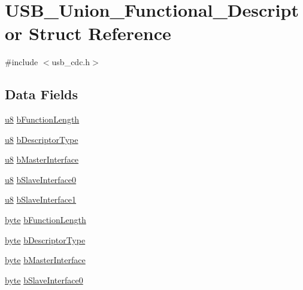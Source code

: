 \hypertarget{struct_u_s_b___union___functional___descriptor}{\section{U\-S\-B\-\_\-\-Union\-\_\-\-Functional\-\_\-\-Descriptor Struct Reference}
\label{struct_u_s_b___union___functional___descriptor}
}


{\ttfamily \#include $<$usb\-\_\-cdc.\-h$>$}

\subsection*{Data Fields}
\begin{DoxyCompactItemize}
\item 
\hyperlink{p8_2pinguino_2core_2typedef_8h_aed742c436da53c1080638ce6ef7d13de}{u8} \hyperlink{struct_u_s_b___union___functional___descriptor_a26c0bc44674a4154a958ce07a0d5b0fd}{b\-Function\-Length}
\item 
\hyperlink{p8_2pinguino_2core_2typedef_8h_aed742c436da53c1080638ce6ef7d13de}{u8} \hyperlink{struct_u_s_b___union___functional___descriptor_af6d6c7e334878414c973fc10e54cfb4e}{b\-Descriptor\-Type}
\item 
\hyperlink{p8_2pinguino_2core_2typedef_8h_aed742c436da53c1080638ce6ef7d13de}{u8} \hyperlink{struct_u_s_b___union___functional___descriptor_aa6c02ce2914ff851df5c3ac40bc4bba7}{b\-Master\-Interface}
\item 
\hyperlink{p8_2pinguino_2core_2typedef_8h_aed742c436da53c1080638ce6ef7d13de}{u8} \hyperlink{struct_u_s_b___union___functional___descriptor_a0329be90e8ea172f2fa8c0e14ff4e95f}{b\-Slave\-Interface0}
\item 
\hyperlink{p8_2pinguino_2core_2typedef_8h_aed742c436da53c1080638ce6ef7d13de}{u8} \hyperlink{struct_u_s_b___union___functional___descriptor_a10bb62fbd7e26591abf171f512791d81}{b\-Slave\-Interface1}
\item 
\hyperlink{p8_2pinguino_2core_2typedef_8h_a0c8186d9b9b7880309c27230bbb5e69d}{byte} \hyperlink{struct_u_s_b___union___functional___descriptor_a2d45c545dca79b1a912a7fa0e8d3a691}{b\-Function\-Length}
\item 
\hyperlink{p8_2pinguino_2core_2typedef_8h_a0c8186d9b9b7880309c27230bbb5e69d}{byte} \hyperlink{struct_u_s_b___union___functional___descriptor_a0b4dacbe8b9cc6e176f298a4fe7bbd39}{b\-Descriptor\-Type}
\item 
\hyperlink{p8_2pinguino_2core_2typedef_8h_a0c8186d9b9b7880309c27230bbb5e69d}{byte} \hyperlink{struct_u_s_b___union___functional___descriptor_a38161403ddd7bcc7d1cd008d6d78139d}{b\-Master\-Interface}
\item 
\hyperlink{p8_2pinguino_2core_2typedef_8h_a0c8186d9b9b7880309c27230bbb5e69d}{byte} \hyperlink{struct_u_s_b___union___functional___descriptor_a649dbf17f4722360bbc65565714a613e}{b\-Slave\-Interface0}
\end{DoxyCompactItemize}


